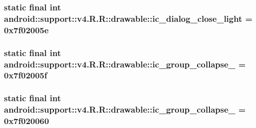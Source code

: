 \hypertarget{classandroid_1_1support_1_1v4_1_1_r_1_1drawable_35da1e6da39dfeb1d75bd2271a31648c}{
\subsubsection[{ic\_\-dialog\_\-close\_\-light}]{\setlength{\rightskip}{0pt plus 5cm}static final int android::support::v4.R.R::drawable::ic\_\-dialog\_\-close\_\-light = 0x7f02005e}}
\label{classandroid_1_1support_1_1v4_1_1_r_1_1drawable_35da1e6da39dfeb1d75bd2271a31648c}


\hypertarget{classandroid_1_1support_1_1v4_1_1_r_1_1drawable_fddcc83ded4f697e0197fa47d5b1e673}{
\subsubsection[{ic\_\-group\_\-collapse\_\-00}]{\setlength{\rightskip}{0pt plus 5cm}static final int android::support::v4.R.R::drawable::ic\_\-group\_\-collapse\_ = 0x7f02005f}}
\label{classandroid_1_1support_1_1v4_1_1_r_1_1drawable_fddcc83ded4f697e0197fa47d5b1e673}


\hypertarget{classandroid_1_1support_1_1v4_1_1_r_1_1drawable_085a62e51c2742e87afc7c000dcb064f}{
\subsubsection[{ic\_\-group\_\-collapse\_\-01}]{\setlength{\rightskip}{0pt plus 5cm}static final int android::support::v4.R.R::drawable::ic\_\-group\_\-collapse\_ = 0x7f020060}}
\label{classandroid_1_1support_1_1v4_1_1_r_1_1drawable_085a62e51c2742e87afc7c000dcb064f}


